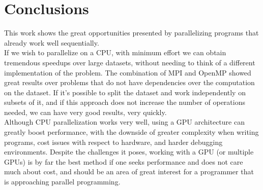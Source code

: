 \documentclass{article}
\begin{document}
\section*{Conclusions}
This work shows the great opportunities presented by parallelizing programs that already work well sequentially.\\
If we wish to parallelize on a CPU, with minimum effort we can obtain tremendous speedups over large datasets, without needing to think of a different implementation of the problem. The combination of MPI and OpenMP showed great results over problems that do not have dependencies over the computation on the dataset. If it's possible to split the dataset and work independently on subsets of it, and if this approach does not increase the number of operations needed, we can have very good results, very quickly.\\
Although CPU parallelization works very well, using a GPU architecture can greatly boost performance, with the downside of greater complexity when writing programs, cost issues with respect to hardware, and harder debugging environments. Despite the challenges it poses, working with a GPU (or multiple GPUs) is by far the best method if one seeks performance and does not care much about cost, and should be an area of great interest for a programmer that is approaching parallel programming.
\end{document}
